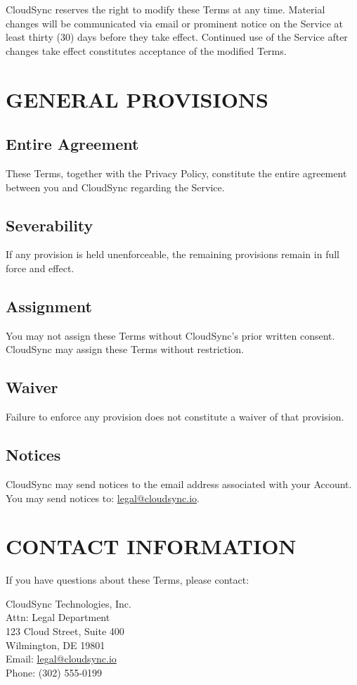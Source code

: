 \documentclass[
    language=english,
    doctype=terms-of-service,
    institution=none,
]{../../omnilatex}
\begin{document}
CloudSync reserves the right to modify these Terms at any time. Material changes will be communicated via email or prominent notice on the Service at least thirty (30) days before they take effect. Continued use of the Service after changes take effect constitutes acceptance of the modified Terms.

\section{GENERAL PROVISIONS}

\subsection{Entire Agreement}
These Terms, together with the Privacy Policy, constitute the entire agreement between you and CloudSync regarding the Service.

\subsection{Severability}
If any provision is held unenforceable, the remaining provisions remain in full force and effect.

\subsection{Assignment}
You may not assign these Terms without CloudSync's prior written consent. CloudSync may assign these Terms without restriction.

\subsection{Waiver}
Failure to enforce any provision does not constitute a waiver of that provision.

\subsection{Notices}
CloudSync may send notices to the email address associated with your Account. You may send notices to: \url{legal@cloudsync.io}.

\section{CONTACT INFORMATION}

If you have questions about these Terms, please contact:

CloudSync Technologies, Inc.\\
Attn: Legal Department\\
123 Cloud Street, Suite 400\\
Wilmington, DE 19801\\
Email: \url{legal@cloudsync.io}\\
Phone: (302) 555-0199
\end{document}
